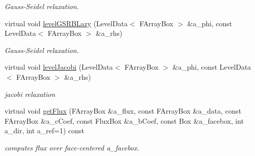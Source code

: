 \begin{DoxyCompactItemize}
\begin{DoxyCompactList}\small\item\em Gauss-\/\-Seidel relaxation. \end{DoxyCompactList}\item 
\hypertarget{class_darcy_brinkman_op_a6743cea1c7637481cc5a40fc7431aece}{virtual void \hyperlink{class_darcy_brinkman_op_a6743cea1c7637481cc5a40fc7431aece}{level\-G\-S\-R\-B\-Lazy} (Level\-Data$<$ F\-Array\-Box $>$ \&a\-\_\-phi, const Level\-Data$<$ F\-Array\-Box $>$ \&a\-\_\-rhs)}\label{class_darcy_brinkman_op_a6743cea1c7637481cc5a40fc7431aece}

\begin{DoxyCompactList}\small\item\em Gauss-\/\-Seidel relaxation. \end{DoxyCompactList}\item 
\hypertarget{class_darcy_brinkman_op_a9ad6b182c9779e420fef314ace1438ae}{virtual void \hyperlink{class_darcy_brinkman_op_a9ad6b182c9779e420fef314ace1438ae}{level\-Jacobi} (Level\-Data$<$ F\-Array\-Box $>$ \&a\-\_\-phi, const Level\-Data$<$ F\-Array\-Box $>$ \&a\-\_\-rhs)}\label{class_darcy_brinkman_op_a9ad6b182c9779e420fef314ace1438ae}

\begin{DoxyCompactList}\small\item\em jacobi relaxation \end{DoxyCompactList}\item 
\hypertarget{class_darcy_brinkman_op_a58e6e29ef7c3648c4ff3f159f9a4f660}{virtual void \hyperlink{class_darcy_brinkman_op_a58e6e29ef7c3648c4ff3f159f9a4f660}{get\-Flux} (F\-Array\-Box \&a\-\_\-flux, const F\-Array\-Box \&a\-\_\-data, const F\-Array\-Box \&a\-\_\-c\-Coef, const Flux\-Box \&a\-\_\-b\-Coef, const Box \&a\-\_\-facebox, int a\-\_\-dir, int a\-\_\-ref=1) const }\label{class_darcy_brinkman_op_a58e6e29ef7c3648c4ff3f159f9a4f660}

\begin{DoxyCompactList}\small\item\em computes flux over face-\/centered a\-\_\-facebox. \end{DoxyCompactList}\end{DoxyCompactItemize}
